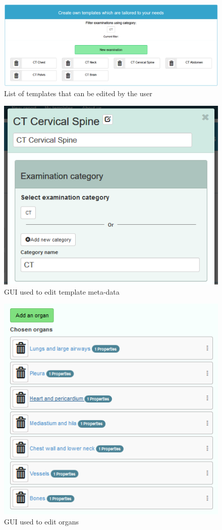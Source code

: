 \documentclass[12pt, twoside, openany]{report}
\theoremstyle{definition}
\begin{document}
\begin{figure}
    \centering
    \includegraphics[width=0.9\linewidth]{templates-list}
    \caption{List of templates that can be edited by the user\label{fig:templates-list}}
\end{figure}
\begin{figure}
    \centering
    \includegraphics{template-metadata}
    \caption{GUI used to edit template meta-data \label{fig:template-metadata}}
\end{figure}
\begin{figure}
    \centering
    \includegraphics{template-organs-list}
    \caption{GUI used to edit organs \label{fig:template-organs-list}}
\end{figure}
\end{document}
